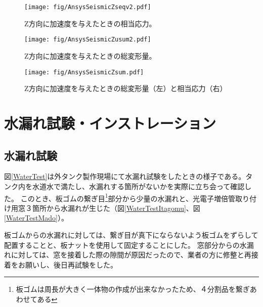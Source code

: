 \documentclass[11pt]{ltjsreport}
\newcommand{\figref}[1]{図\ref{#1}}
\begin{document}
\begin{figure}[htbp]
\begin{minipage}{0.47\textwidth}
\centering
\texttt{[image: fig/AnsysSeismicZseqv2.pdf]}
\caption[Z方向に加速度を与えたときの相当応力]{Z方向に加速度を与えたときの相当応力。}
\label{SEQVZ}
\end{minipage}
\hfil
\begin{minipage}{0.47\textwidth}
\begin{center}
\texttt{[image: fig/AnsysSeismicZusum2.pdf]}
\caption[Z方向に加速度を与えたときの総変形量]{Z方向に加速度を与えたときの総変形量。}
\label{USUMZ}
\end{center}
\end{minipage}
\end{figure}
\fi%


\begin{figure}[htb]
\centering
\texttt{[image: fig/AnsysSeismicZsum.pdf]}
\caption[Z方向に加速度を与えたときの総変形量と相当応力]{Z方向に加速度を与えたときの総変形量（左）と相当応力（右）}
\label{SeismicZ}
\end{figure}

\newpage
\section{水漏れ試験・インストレーション}

\subsection{水漏れ試験}
\figref{WaterTest}は外タンク製作現場にて水漏れ試験をしたときの様子である。タンク内を水道水で満たし、水漏れする箇所がないかを実際に立ち会って確認した。
このとき、板ゴムの繋ぎ目\footnote{板ゴムは周長が大きく一体物の作成が出来なかったため、４分割品を繋ぎあわせてある}部分から少量の水漏れと、光電子増倍管取り付け用窓３箇所から水漏れが生じた（\figref{WaterTestItagomu}、\figref{WaterTestMado}）。

板ゴムからの水漏れに対しては、繋ぎ目が真下にならないよう板ゴムをずらして配置することと、板ナットを使用して固定することにした。
窓部分からの水漏れに対しては、窓を接着した際の隙間が原因だったので、業者の方に修整と再接着をお願いし、後日再試験をした。
\end{document}
